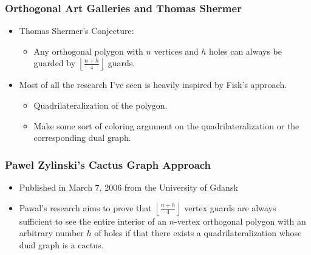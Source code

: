 \documentclass{beamer}
\begin{document}
\begin{frame}
\frametitle{Orthogonal Art Galleries and Thomas Shermer}
\begin{center}
\begin{itemize}
	\item Thomas Shermer's Conjecture: 
		\begin{itemize}
		\item Any orthogonal polygon with $n$ vertices and $h$ holes can always be guarded by $\left \lfloor{\frac{n+h}{4}}\right \rfloor$ guards. 
		\end{itemize}
		\vfill
	\item Most of all the research I've seen is heavily inspired by Fisk's approach. 
		\begin{itemize}
		\item Quadrilateralization of the polygon.
		\vfill
		\item Make some sort of coloring argument on the quadrilateralization or the corresponding dual graph.  
		\end{itemize}
\end{itemize}\end{center}
\end{frame}

\begin{frame}
\frametitle{Pawel Zylinski's Cactus Graph Approach}
\begin{center}
\begin{itemize}
	\item Published in March 7, 2006 from the University of Gdansk
	\vfill
	\item Pawal's research aims to prove that $\left \lfloor{\frac{n+h}{4}}\right \rfloor$ vertex guards are always sufficient to see the entire interior
	of an $n$-vertex orthogonal polygon with an arbitrary number $h$ of holes if
	that there exists a quadrilateralization whose dual graph is a cactus.
\end{itemize}
\end{center}
\end{frame}
\end{document}
